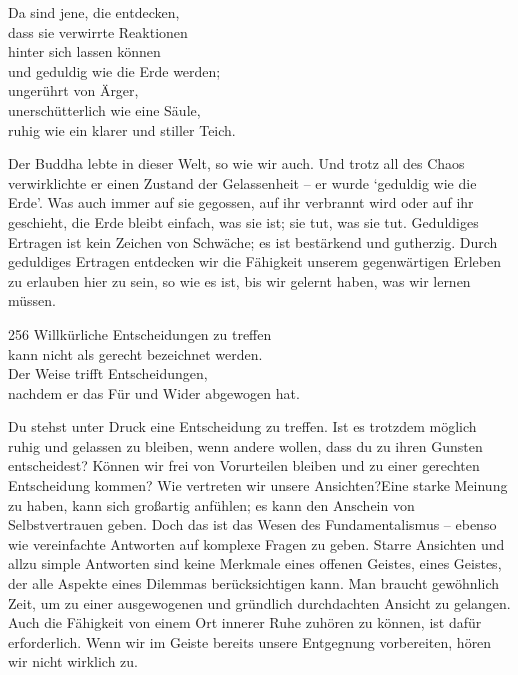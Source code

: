 
\begin{dhpVerse}{95}
\label{dhp-95}
Da sind jene, die entdecken,\\ 
dass sie verwirrte Reaktionen\\ 
hinter sich lassen können\\ 
und geduldig wie die Erde werden;\\ 
ungerührt von Ärger,\\ 
unerschütterlich wie eine Säule,\\ 
ruhig wie ein klarer und stiller Teich. 
\end{dhpVerse}

\begin{dhpRefl}

Der Buddha lebte in dieser Welt, so wie wir auch. Und trotz all des Chaos
verwirklichte er einen Zustand der Gelassenheit -- er wurde `geduldig wie die
Erde'. Was auch immer auf sie gegossen, auf ihr verbrannt wird oder auf ihr
geschieht, die Erde bleibt einfach, was sie ist; sie tut, was sie tut.
Geduldiges Ertragen ist kein Zeichen von Schwäche; es ist bestärkend und
gutherzig. Durch geduldiges Ertragen entdecken wir die Fähigkeit unserem
gegenwärtigen Erleben zu erlauben hier zu sein, so wie es ist, bis wir gelernt
haben, was wir lernen müssen.

\end{dhpRefl}


\begin{dhpVerse}{256}
\label{dhp-256}
Willkürliche Entscheidungen zu treffen\\ 
kann nicht als gerecht bezeichnet werden.\\ 
Der Weise trifft Entscheidungen,\\ 
nachdem er das Für und Wider abgewogen hat. 
\end{dhpVerse}

\begin{dhpRefl}

Du stehst unter Druck eine Entscheidung zu treffen. Ist es trotzdem möglich
ruhig und gelassen zu bleiben, wenn andere wollen, dass du zu ihren Gunsten
entscheidest? Können wir frei von Vorurteilen bleiben und zu einer gerechten
Entscheidung kommen? Wie vertreten wir unsere Ansichten?Eine starke Meinung zu
haben, kann sich großartig anfühlen; es kann den Anschein von Selbstvertrauen
geben. Doch das ist das Wesen des Fundamentalismus -- ebenso wie vereinfachte
Antworten auf komplexe Fragen zu geben. Starre Ansichten und allzu simple
Antworten sind keine Merkmale eines offenen Geistes, eines Geistes, der alle
Aspekte eines Dilemmas berücksichtigen kann. Man braucht gewöhnlich Zeit, um
zu einer ausgewogenen und gründlich durchdachten Ansicht zu gelangen. Auch die
Fähigkeit von einem Ort innerer Ruhe zuhören zu können, ist dafür
erforderlich. Wenn wir im Geiste bereits unsere Entgegnung vorbereiten, hören
wir nicht wirklich zu.

\end{dhpRefl}

